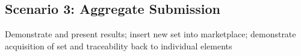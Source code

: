 \documentclass[10pt, conference, compsocconf]{IEEEtran}
\begin{document}
\subsection{Scenario 3: Aggregate Submission}
Demonstrate and present results; insert new set into marketplace; demonstrate acquisition of set and traceability back to individual elements

%
%



%
%
\end{document}
